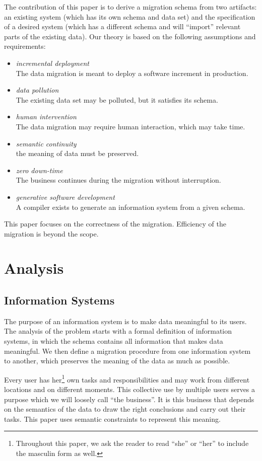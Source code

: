 \documentclass{elsarticle}
\begin{document}
   The contribution of this paper is to derive a migration schema from two artifacts: an existing system
   (which has its own schema and data set) and the specification of a desired system (which has a different schema and will ``import'' relevant parts of the existing data).   
   Our theory is based on the following assumptions and requirements:
\begin{itemize}
   \item {\em incremental deployment}\\The data migration is meant to deploy a software increment in production.
   \item {\em data pollution}\\The existing data set may be polluted, but it satisfies its schema.
   \item {\em human intervention}\\The data migration may require human interaction, which may take time.
   \item {\em semantic continuity}\\the meaning of data must be preserved.
   \item {\em zero down-time}\\The business continues during the migration without interruption.
   \item {\em generative software development}\\A compiler exists to generate an information system from a given schema.
\end{itemize}
   This paper focuses on the correctness of the migration.
   Efficiency of the migration is beyond the scope.

\section{Analysis}
\label{sct:Analysis}
\subsection{Information Systems}
   The purpose of an information system is to make data meaningful to its users.
   The analysis of the problem starts with a formal definition of information systems,
   in which the schema contains all information that makes data meaningful.
   We then define a migration procedure from one information system to another,
   which preserves the meaning of the data as much as possible.

   Every user has her\footnote{Throughout this paper, we ask the reader to read ``she'' or ``her'' to include the masculin form as well.} own tasks and responsibilities
   and may work from different locations and on different moments.
   This collective use by multiple users serves a purpose which we will loosely call ``the business''.
   It is this business that depends on the semantics of the data to draw the right conclusions and carry out their tasks.
   This paper uses semantic constraints to represent this meaning.
   
\end{document}
